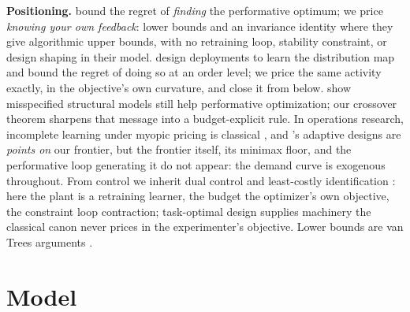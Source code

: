 \documentclass{article}
\begin{document}
\textbf{Positioning.} \citet{jagadeesan2022regret} bound the regret of \emph{finding} the performative optimum; we price \emph{knowing your own feedback}: lower bounds and an invariance identity where they give algorithmic upper bounds, with no retraining loop, stability constraint, or design shaping in their model. \citet{bracale2025reverse} design deployments to learn the distribution map and bound the regret of doing so at an order level; we price the same activity exactly, in the objective's own curvature, and close it from below. \citet{lin2024plugin} show misspecified structural models still help performative optimization; our crossover theorem sharpens that message into a budget-explicit rule. In operations research, incomplete learning under myopic pricing is classical \citep{rothschild1974two,harrison2012bayesian,keskin2014dynamic,broder2012dynamic,denboer2015dynamic}, and \citet{lai1979adaptive}'s adaptive designs are \emph{points on} our frontier, but the frontier itself, its minimax floor, and the performative loop generating it do not appear: the demand curve is exogenous throughout. From control we inherit dual control \citep{feldbaum1960dual} and least-costly identification \citep{bombois2006least}: here the plant is a retraining learner, the budget the optimizer's own objective, the constraint loop contraction; task-optimal design \citep{wagenmaker2021task,dean2020sample} supplies machinery the classical canon \citep{kiefer1960equivalence,pukelsheim2006optimal} never prices in the experimenter's objective. Lower bounds are van Trees arguments \citep{gill1995applications}.

\section{Model}
\label{sec:model}
\end{document}
